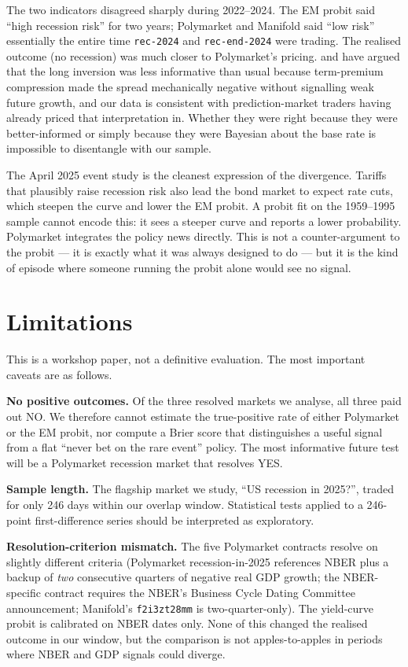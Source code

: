 \documentclass{article}
\begin{document}
The two indicators disagreed sharply during 2022--2024. The EM probit said ``high recession risk'' for two years; Polymarket and Manifold said ``low risk'' essentially the entire time \texttt{rec-2024} and \texttt{rec-end-2024} were trading. The realised outcome (no recession) was much closer to Polymarket's pricing. \citet{bauer2018information} and \citet{engstrom2019near} have argued that the long inversion was less informative than usual because term-premium compression made the spread mechanically negative without signalling weak future growth, and our data is consistent with prediction-market traders having already priced that interpretation in. Whether they were right because they were better-informed or simply because they were Bayesian about the base rate is impossible to disentangle with our sample.

The April 2025 event study is the cleanest expression of the divergence. Tariffs that plausibly raise recession risk also lead the bond market to expect rate cuts, which steepen the curve and lower the EM probit. A probit fit on the 1959--1995 sample cannot encode this: it sees a steeper curve and reports a lower probability. Polymarket integrates the policy news directly. This is not a counter-argument to the probit --- it is exactly what it was always designed to do --- but it is the kind of episode where someone running the probit alone would see no signal.

\section{Limitations}

This is a workshop paper, not a definitive evaluation. The most important caveats are as follows.

\textbf{No positive outcomes.} Of the three resolved markets we analyse, all three paid out NO. We therefore cannot estimate the true-positive rate of either Polymarket or the EM probit, nor compute a Brier score that distinguishes a useful signal from a flat ``never bet on the rare event'' policy. The most informative future test will be a Polymarket recession market that resolves YES.

\textbf{Sample length.} The flagship market we study, ``US recession in 2025?'', traded for only 246 days within our overlap window. Statistical tests applied to a 246-point first-difference series should be interpreted as exploratory.

\textbf{Resolution-criterion mismatch.} The five Polymarket contracts resolve on slightly different criteria (Polymarket recession-in-2025 references NBER plus a backup of \emph{two} consecutive quarters of negative real GDP growth; the NBER-specific contract requires the NBER's Business Cycle Dating Committee announcement; Manifold's \texttt{f2i3zt28mm} is two-quarter-only). The yield-curve probit is calibrated on NBER dates only. None of this changed the realised outcome in our window, but the comparison is not apples-to-apples in periods where NBER and GDP signals could diverge.
\end{document}
